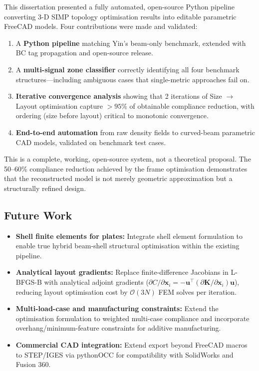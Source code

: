 \documentclass[11pt,a4paper]{article}
\begin{document}
This dissertation presented a fully automated, open-source Python pipeline
converting 3-D SIMP topology optimisation results into editable parametric
FreeCAD models.
Four contributions were made and validated:

\begin{enumerate}
    \item A \textbf{Python pipeline} matching Yin's \cite{yin2020} beam-only
          benchmark, extended with BC tag propagation and open-source release.
    \item A \textbf{multi-signal zone classifier} correctly identifying all
          four benchmark structures---including ambiguous cases that single-metric
          approaches fail on.
    \item \textbf{Iterative convergence analysis} showing that 2 iterations
          of Size $\to$ Layout optimisation capture $>95\%$ of obtainable
          compliance reduction, with ordering (size before layout) critical to
          monotonic convergence.
    \item \textbf{End-to-end automation} from raw density fields to
          curved-beam parametric CAD models, validated on benchmark test cases.
\end{enumerate}

This is a complete, working, open-source system, not a theoretical proposal.
The 50--60\% compliance reduction achieved by the frame optimisation
demonstrates that the reconstructed model is not merely geometric
approximation but a structurally refined design.

\subsection{Future Work}

\begin{itemize}
    \item \textbf{Shell finite elements for plates:} Integrate shell element
          formulation to enable true hybrid beam-shell structural optimisation
          within the existing pipeline.
    \item \textbf{Analytical layout gradients:} Replace finite-difference
          Jacobians in L-BFGS-B with analytical adjoint gradients
          ($\partial C / \partial \mathbf{x}_i = -\mathbf{u}^\top
          (\partial \mathbf{K}/\partial \mathbf{x}_i)\mathbf{u}$),
          reducing layout optimisation cost by $\mathcal{O}(3N)$ FEM solves
          per iteration.
    \item \textbf{Multi-load-case and manufacturing constraints:}
          Extend the optimisation formulation to weighted multi-case compliance
          and incorporate overhang/minimum-feature constraints for additive
          manufacturing.
    \item \textbf{Commercial CAD integration:}
          Extend export beyond FreeCAD macros to STEP/IGES via
          pythonOCC for compatibility with SolidWorks and Fusion 360.
\end{itemize}
\end{document}

